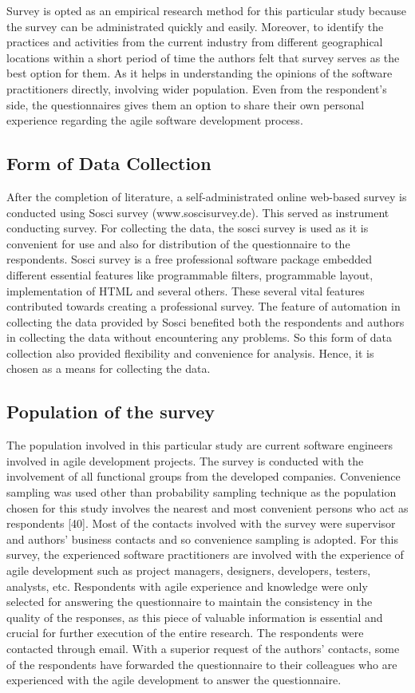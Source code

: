 \documentclass[a4paper,oneside]{bth}
\begin{document}
Survey is opted as an empirical research method for this particular study because the survey can be administrated quickly and easily. Moreover, to identify the practices and activities from the current industry from different geographical locations within a short period of time the authors felt that survey serves as the best option for them. As it helps in understanding the opinions of the software practitioners directly, involving wider population. Even from the respondent’s side, the questionnaires gives them an option to share their own personal experience regarding the agile software development process.
\subsection{Form of Data Collection}
After the completion of literature, a self-administrated online web-based survey is conducted using Sosci survey (www.soscisurvey.de). This served as instrument conducting survey. For collecting the data, the sosci survey is used as it is convenient for use and also for distribution of the questionnaire to the respondents. Sosci survey is a free professional software package embedded different essential features like programmable filters, programmable layout, implementation of HTML and several others. These several vital features contributed towards creating a professional survey. The feature of automation in collecting the data provided by Sosci benefited both the respondents and authors in collecting the data without encountering any problems. So this form of data collection also provided flexibility and convenience for analysis. Hence, it is chosen as a means for collecting the data.
\subsection{Population of the survey}
The population involved in this particular study are current software engineers involved in agile development projects. The survey is conducted with the involvement of all functional groups from the developed companies. Convenience sampling was used other than probability sampling technique as the population chosen for this study involves the nearest and most convenient persons who act as respondents [40]. Most of the contacts involved with the survey were supervisor and authors’ business contacts and so convenience sampling is adopted. For this survey, the experienced software practitioners are involved with the experience of agile development such as project managers, designers, developers, testers, analysts, etc. Respondents with agile experience and knowledge were only selected for answering the questionnaire to maintain the consistency in the quality of the responses, as this piece of valuable information is essential and crucial for further execution of the entire research. The respondents were contacted through email. With a superior request of the authors’ contacts, some of the respondents have forwarded the questionnaire to their colleagues who are experienced with the agile development to answer the questionnaire.
\end{document}
